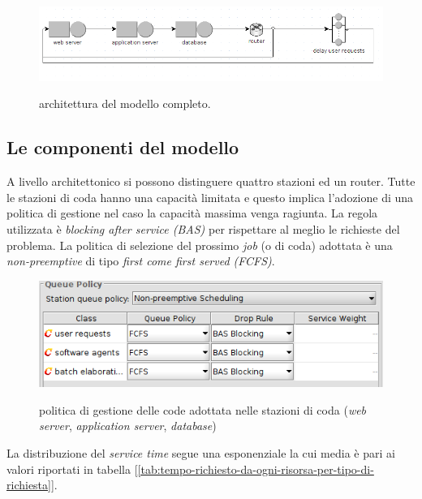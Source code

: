 \documentclass[../main.tex]{subfiles}
\begin{document}
    \begin{figure}[H]
        \centering
        \includegraphics[scale = 0.6]{assets/modello_jsim}\\
        \caption[\textit{Architettura} del modello]{architettura del modello completo.}
        \label{fig:architettura-del-modello-completo}
    \end{figure}

    \subsection{Le componenti del modello}\label{subsec:le-componenti-del-modello}
    A livello architettonico si possono distinguere quattro stazioni ed un router.
    Tutte le stazioni di coda hanno una capacità limitata e questo implica l'adozione di una politica di gestione nel
    caso la capacità massima venga ragiunta.
    La regola utilizzata è \textit{blocking after service (BAS)} per rispettare al meglio le richieste del problema.
    La politica di selezione del prossimo \textit{job} (o di coda) adottata è una  \textit{non-preemptive} di tipo \textit{first come first served (FCFS)}.
    \begin{figure}[H]
        \centering
        \includegraphics[scale = 0.5]{assets/queue_policy.png}\\
        \caption[\textit{Politica} di gestione delle code]{ politica di gestione delle code adottata nelle stazioni di coda (\textit{web server}, \textit{application server}, \textit{database})}
        \label{fig:politica-di-coda}
    \end{figure}
    La distribuzione del \textit{service time} segue una esponenziale la cui media è pari ai valori riportati in tabella [\ref{tab:tempo-richiesto-da-ogni-risorsa-per-tipo-di-richiesta}].
\end{document}
